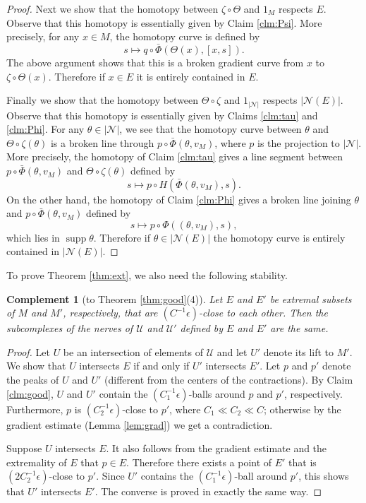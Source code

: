 \documentclass[a4paper,12pt]{amsart}
\theoremstyle{plain}
\newtheorem{comp}[thm]{Complement}
\theoremstyle{definition}
\numberwithin{thm}{section}
\numberwithin{equation}{section}
\DeclareMathOperator{\supp}{supp}
\begin{document}
\begin{proof}
Next we show that the homotopy between $\zeta\circ\Theta$ and $1_M$ respects $E$.
Observe that this homotopy is essentially given by Claim \ref{clm:Psi}.
More precisely, for any $x\in M$, the homotopy curve is defined by
\[s\mapsto q\circ\bar\Phi(\Theta(x),[x,s]).\]
The above argument shows that this is a broken gradient curve from $x$ to $\zeta\circ\Theta(x)$.
Therefore if $x\in E$ it is entirely contained in $E$.

Finally we show that the homotopy between $\Theta\circ\zeta$ and $1_{|\mathcal N|}$ respects $|\mathcal N(E)|$.
Observe that this homotopy is essentially given by Claims \ref{clm:tau} and \ref{clm:Phi}.
For any $\theta\in|\mathcal N|$, we see that the homotopy curve between $\theta$ and $\Theta\circ\zeta(\theta)$ is a broken line through $p\circ\bar\Phi(\theta,v_M)$, where $p$ is the projection to $|\mathcal N|$.
More precisely, the homotopy of Claim \ref{clm:tau} gives a line segment between $p\circ\bar\Phi(\theta,v_M)$ and $\Theta\circ\zeta(\theta)$ defined by
\[s\mapsto p\circ H(\bar\Phi(\theta,v_M),s).\]
On the other hand, the homotopy of Claim \ref{clm:Phi} gives a broken line joining $\theta$ and $p\circ\bar\Phi(\theta,v_M)$ defined by
\[s\mapsto p\circ\Phi((\theta,v_M),s),\]
which lies in $\supp\theta$.
Therefore if $\theta\in|\mathcal N(E)|$ the homotopy curve is entirely contained in $|\mathcal N(E)|$.
\end{proof}

To prove Theorem \ref{thm:ext}, we also need the following stability.

\begin{comp}[to Theorem \ref{thm:good}(4)]\label{comp:good}
Let $E$ and $E'$ be extremal subsets of $M$ and $M'$, respectively, that are $(C^{-1}\epsilon)$-close to each other.
Then the subcomplexes of the nerves of $\mathcal U$ and $\mathcal U'$ defined by $E$ and $E'$ are the same.
\end{comp}

\begin{proof}
Let $U$ be an intersection of elements of $\mathcal U$ and let $U'$ denote its lift to $M'$.
We show that $U$ intersects $E$ if and only if  $U'$ intersects $E'$.
Let $p$ and $p'$ denote the peaks of $U$ and $U'$ (different from the centers of the contractions).
By Claim \ref{clm:good}, $U$ and $U'$ contain the $(C_1^{-1}\epsilon)$-balls around $p$ and $p'$, respectively.
Furthermore, $p$ is $(C_2^{-1}\epsilon)$-close to $p'$, where $C_1\ll C_2\ll C$; otherwise by the gradient estimate (Lemma \ref{lem:grad}) we get a contradiction.

Suppose $U$ intersects $E$.
It also follows from the gradient estimate and the extremality of $E$ that $p\in E$.
Therefore there exists a point of $E'$ that is $(2C_2^{-1}\epsilon)$-close to $p'$.
Since $U'$ contains the $(C_1^{-1}\epsilon)$-ball around $p'$, this shows that $U'$ intersects $E'$.
The converse is proved in exactly the same way.
\end{proof}
\end{document}
